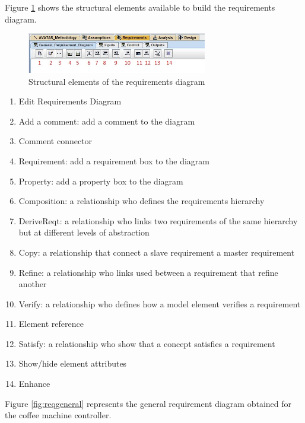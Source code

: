 \documentclass[12pt]{article}
\begin{document}
		Figure \ref{fig:reqdiagram} shows the structural elements available to build the requirements diagram.


\begin{figure}[htbp]
\centering
\includegraphics[width=0.7\textwidth]{fig/reqdiagram.jpg}
\caption{Structural elements of the requirements diagram} \label{fig:reqdiagram}
\end{figure}

\begin{enumerate}
\item Edit Requirements Diagram
\item Add a comment: add a comment to the diagram
\item Comment connector
\item Requirement: add a requirement box to the diagram
\item Property: add a property box to the diagram
\item Composition: a relationship who defines the requirements hierarchy
\item DeriveReqt: a relationship who links two requirements of the same hierarchy but at different levels of abstraction
\item Copy: a relationship that connect a slave requirement a master requirement
\item Refine: a relationship who links used between a requirement that refine another
\item Verify: a relationship who defines how a model element verifies a requirement
\item Element reference
\item Satisfy: a relationship who show that a concept satisfies a requirement
\item Show/hide element attributes
\item Enhance

\end{enumerate}

Figure \ref{fig:reqgeneral} represents the general requirement diagram obtained for the coffee machine controller.
\end{document}
